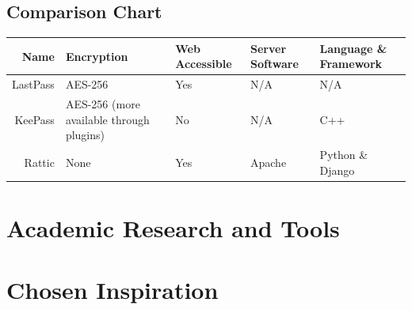 		\subsection{Comparison Chart}
			\begin{table}
				\begin{tabular}{ r l l l l }
					Name 				& Encryption  & Web Accessible 		& Server Software 		& Language \& Framework 		\\
					\hline
					LastPass 			& AES-256 		& Yes			& N/A 				& N/A \\
					KeePass 			& AES-256 (more available through plugins) & No & N/A & C++ \\
					Rattic 				& None 			& Yes 			& Apache 		& Python \& Django \\
				\end{tabular}
			\end{table}



	\section{Academic Research and Tools}
	\section{Chosen Inspiration}